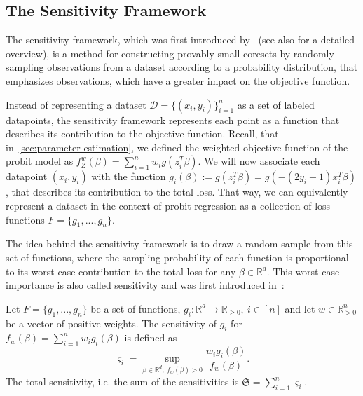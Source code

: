 \subsection{The Sensitivity Framework}

The sensitivity framework, which was first introduced
by~\cite{feldman-langberg-coresets} (see also
\cite{big-data-tiny-data} for a detailed overview),
is a method for constructing
provably small coresets by randomly sampling observations
from a dataset according to a probability distribution, that
emphasizes observations, which have a greater impact on the
objective function.

Instead of representing a dataset $\mathcal{D} = \{(x_i, y_i)\}_{i=1}^n$
as a set of labeled datapoints, the sensitivity framework
represents each point as a function that describes its
contribution to the objective function.
Recall, that in~\ref{sec:parameter-estimation}, we defined the
weighted objective function of the probit model as
$f_Z^w(\beta) = \sum_{i=1}^n w_i g(z_i^T \beta)$.
We will now associate each datapoint $(x_i, y_i)$ with the function
$g_i(\beta) := g(z_i^T \beta) = g(-(2y_i - 1)x_i^T \beta)$,
that describes its contribution to the total loss.
That way, we can equivalently represent a dataset in the context
of probit regression as a collection of loss functions
$F = \{g_1, ..., g_n\}$.

The idea behind the sensitivity framework is to draw a random
sample from this set of functions, where the sampling probability
of each function is proportional to its worst-case
contribution to the total loss for any $\beta \in \mathbb{R}^d$.
This worst-case importance is also called sensitivity and was first
introduced in~\cite{langberg-schulman-sensitivities}:

\begin{definition}
    \label{def:sensitivity}
    Let $F = \{ g_1, ..., g_n \}$ be a set of functions,
    $g_i: \mathbb{R}^d \rightarrow \mathbb{R}_{\geq 0}, \ i \in [n]$
    and let $w \in \mathbb{R}^n_{>0}$ be a vector of positive weights.
    The sensitivity of $g_i$ for $f_w(\beta) = \sum_{i=1}^n w_i g_i(\beta)$ is defined as
    \begin{equation*}
        \varsigma_i = \sup_{\beta \in \mathbb{R}^d, \ f_w(\beta) > 0} \frac{w_i g_i(\beta)}{f_w(\beta)}.
    \end{equation*}
    The total sensitivity, i.e. the sum of the sensitivities is $\mathfrak{S} = \sum_{i=1}^n \varsigma_i$.
\end{definition}

